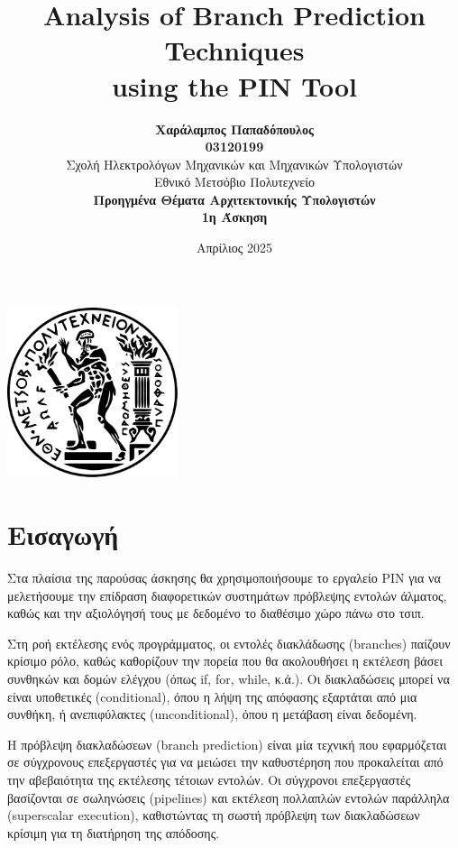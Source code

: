 \documentclass{article}
\title{\Huge Analysis of Branch Prediction Techniques \\[1em] using the PIN Tool}
\author{
  \textbf{Χαράλαμπος Παπαδόπουλος\\ 03120199} \\
  Σχολή Ηλεκτρολόγων Μηχανικών και Μηχανικών Υπολογιστών \\
  Εθνικό Μετσόβιο Πολυτεχνείο\\[2em]
  \textbf{Προηγμένα Θέματα Αρχιτεκτονικής Υπολογιστών\\ 1η Άσκηση} \\
}
\date{Απρίλιος 2025}
\begin{document}
\begin{titlepage}
    \centering
    \vspace*{3cm}
    
    {\Huge\bfseries \thetitle \par}
    \vspace{2cm}
    
    {\Large \theauthor \par}
    \vfill
    \includegraphics[width=5cm]{figures/emp.png}  %
    \vspace{3.5cm}
    
    {\large \thedate \par}
\end{titlepage}


\newpage

\section{Εισαγωγή}

Στα πλαίσια της παρούσας άσκησης θα χρησιμοποιήσουμε το εργαλείο PIN για να μελετήσουμε την επίδραση διαφορετικών συστημάτων πρόβλεψης εντολών άλματος, καθώς και την αξιολόγησή τους με δεδομένο το διαθέσιμο χώρο πάνω στο τσιπ.

Στη ροή εκτέλεσης ενός προγράμματος, οι εντολές διακλάδωσης (branches) παίζουν κρίσιμο ρόλο, καθώς καθορίζουν την πορεία που θα ακολουθήσει η εκτέλεση βάσει συνθηκών και δομών ελέγχου (όπως if, for, while, κ.ά.). Οι διακλαδώσεις μπορεί να είναι υποθετικές (conditional), όπου η λήψη της απόφασης εξαρτάται από μια συνθήκη, ή ανεπιφύλακτες (unconditional), όπου η μετάβαση είναι δεδομένη.

Η πρόβλεψη διακλαδώσεων (branch prediction) είναι μία τεχνική που εφαρμόζεται σε σύγχρονους επεξεργαστές για να μειώσει την καθυστέρηση που προκαλείται από την αβεβαιότητα της εκτέλεσης τέτοιων εντολών. Οι σύγχρονοι επεξεργαστές βασίζονται σε σωληνώσεις (pipelines) και εκτέλεση πολλαπλών εντολών παράλληλα (superscalar execution), καθιστώντας τη σωστή πρόβλεψη των διακλαδώσεων κρίσιμη για τη διατήρηση της απόδοσης.
\end{document}
